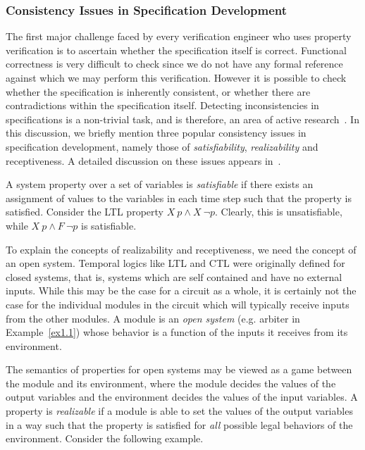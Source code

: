 \documentclass[a4paper, 11pt]{article}
\begin{document}
\subsubsection{Consistency Issues in Specification Development} \label{sec1.2}
The first major challenge faced by every verification engineer who uses 
property verification is
to ascertain whether the specification itself is correct. Functional
correctness is very difficult to check since we do not have any formal
reference against which we may perform this verification. However it is
possible to check whether the specification is inherently consistent, or
whether there are contradictions within the specification itself. 
Detecting inconsistencies in specifications is a non-trivial task, and 
is therefore, an area of active research~\cite{pdgbook, rosner}.
In this discussion, we briefly mention three popular consistency issues 
in specification development, namely those of {\em satisfiability}, 
{\em realizability} and receptiveness. A detailed discussion on these 
issues appears in~\cite{pdgbook}.

A system property over a set of variables is {\em satisfiable} if there
exists an assignment of values to the variables in each time step such that
the property is satisfied. Consider the LTL property $X\ p \land X\ \neg p$. 
Clearly, this is unsatisfiable, while $X\ p \land F\ \neg p$ is 
satisfiable. 

To explain the concepts of realizability and receptiveness, we need the 
concept of an open system. Temporal logics like LTL and CTL were originally 
defined for closed systems, that is, systems which are self contained and 
have no external inputs. While this may be the case for a circuit as a 
whole, it is certainly not the case for the individual modules in the 
circuit which will
typically receive inputs from the other modules. A module is an
{\em open system} (e.g. arbiter in Example~\ref{ex1.1}) whose behavior is a 
function of the inputs it receives from its environment.

The semantics of properties
for open systems may be viewed as a game between the module and its
environment, where the module decides the values of the output variables and
the environment decides the values of the input variables. A property 
is {\em realizable} if a module is able to set the values of the
output variables in a way such that the property is satisfied for {\em all}
possible legal behaviors of the environment. Consider the following example.
\end{document}
